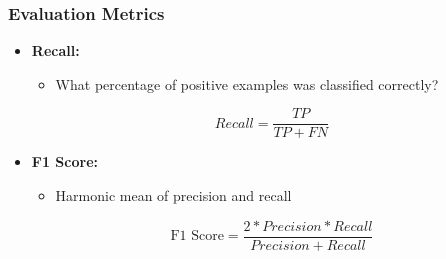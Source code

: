 \begin{frame}
  \frametitle{Evaluation Metrics}
  \begin{itemize}
    \item \textbf{Recall:}
      \begin{itemize}
        \item What percentage of positive examples was classified
          correctly?
      \end{itemize}
      \begin{equation}
        Recall = \frac{TP}{TP + FN}
      \end{equation}
    \item \textbf{F1 Score:}
      \begin{itemize}
        \item Harmonic mean of precision and recall
      \end{itemize}
      \begin{equation}
        \text{F1 Score} = \frac{2*Precision*Recall}{Precision+Recall}
      \end{equation}
  \end{itemize}
\end{frame}

